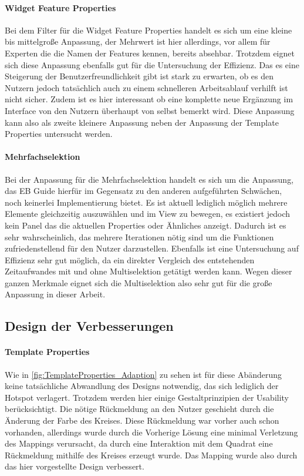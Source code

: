 \paragraph{Widget Feature Properties}
Bei dem Filter für die Widget Feature Properties handelt es sich um eine kleine bis mittelgroße Anpassung, der Mehrwert ist hier allerdings, vor allem für Experten die die Namen der Features kennen, bereits absehbar.
Trotzdem eignet sich diese Anpassung ebenfalls gut für die Untersuchung der Effizienz.
Das es eine Steigerung der Benutzerfreundlichkeit gibt ist stark zu erwarten, ob es den Nutzern jedoch tatsächlich auch zu einem schnelleren Arbeitsablauf verhilft ist nicht sicher.
Zudem ist es hier interessant ob eine komplette neue Ergänzung im Interface von den Nutzern überhaupt von selbst bemerkt wird.
Diese Anpassung kann also als zweite kleinere Anpassung neben der Anpassung der Template Properties untersucht werden.

\paragraph{Mehrfachselektion}
Bei der Anpassung für die Mehrfachselektion handelt es sich um die Anpassung, das EB Guide hierfür im Gegensatz zu den anderen aufgeführten Schwächen, noch keinerlei Implementierung bietet.
Es ist aktuell lediglich möglich mehrere Elemente gleichzeitig auszuwählen und im View zu bewegen, es existiert jedoch kein Panel das die aktuellen Properties oder Ähnliches anzeigt.
Dadurch ist es sehr wahrscheinlich, das mehrere Iterationen nötig sind um die Funktionen zufriedenstellend für den Nutzer darzustellen.
Ebenfalls ist eine Untersuchung auf Effizienz sehr gut möglich, da ein direkter Vergleich des entstehenden Zeitaufwandes mit und ohne Multiselektion getätigt werden kann.
Wegen dieser ganzen Merkmale eignet sich die Multiselektion also sehr gut für die große Anpassung in dieser Arbeit.

\subsection{Design der Verbesserungen}

\paragraph{Template Properties}

Wie in \cref{fig:TemplateProperties_Adaption} zu sehen ist für diese Abänderung keine tatsächliche Abwandlung des Designs notwendig, das sich lediglich der Hotspot verlagert.
Trotzdem werden hier einige Gestaltprinzipien der Usability berücksichtigt.
Die nötige Rückmeldung an den Nutzer geschieht durch die Änderung der Farbe des Kreises.
Diese Rückmeldung war vorher auch schon vorhanden, allerdings wurde durch die Vorherige Lösung eine minimal Verletzung des Mappings verursacht, da durch eine Interaktion mit dem Quadrat eine Rückmeldung mithilfe des Kreises erzeugt wurde. 
Das Mapping wurde also durch das hier vorgestellte Design verbessert.

